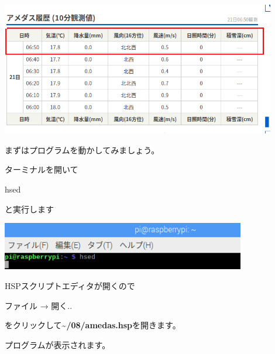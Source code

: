 \begin{center}
\includegraphics[width=0.9\textwidth]{./text08-img/textbook-img029-1.png}

\end{center}

\bigskip

\clearpage
まずはプログラムを動かしてみましょう。

ターミナルを開いて

hsed

と実行します



\begin{center}
\includegraphics[width=0.8\textwidth]{./text08-img/textbook-img013.png}

\end{center}

\bigskip


\bigskip


\bigskip

HSPスクリプトエディタが開くので

ファイル → 開く..

をクリックして\textbf{{\textasciitilde}/08/amedas.hsp}を開きます。

プログラムが表示されます。



